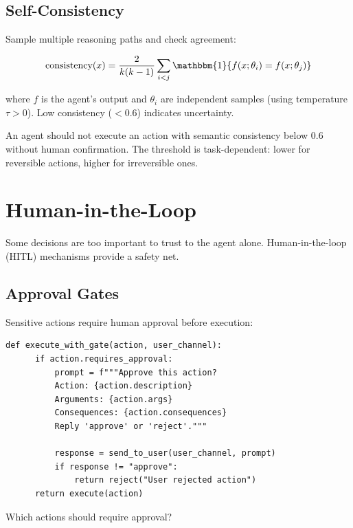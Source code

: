 \subsection{Self-Consistency}

Sample multiple reasoning paths and check agreement:

\begin{equation}
	\text{consistency}(x) = \frac{2}{k(k-1)} \sum_{i<j} \mathbbm{1}\{f(x; \theta_i) = f(x; \theta_j)\}
\end{equation}

where $f$ is the agent's output and $\theta_i$ are independent samples (using temperature $\tau > 0$). Low consistency ($< 0.6$) indicates uncertainty.

\begin{principle}
	An agent should not execute an action with semantic consistency below 0.6 without human confirmation. The threshold is task-dependent: lower for reversible actions, higher for irreversible ones.
\end{principle}

\section{Human-in-the-Loop}

Some decisions are too important to trust to the agent alone. Human-in-the-loop (HITL) mechanisms provide a safety net.

\subsection{Approval Gates}

Sensitive actions require human approval before execution:

\begin{lstlisting}[caption=Approval gate flow]
  def execute_with_gate(action, user_channel):
      if action.requires_approval:
          prompt = f"""Approve this action?
          Action: {action.description}
          Arguments: {action.args}
          Consequences: {action.consequences}
          Reply 'approve' or 'reject'."""

          response = send_to_user(user_channel, prompt)
          if response != "approve":
              return reject("User rejected action")
      return execute(action)
\end{lstlisting}

Which actions should require approval?

